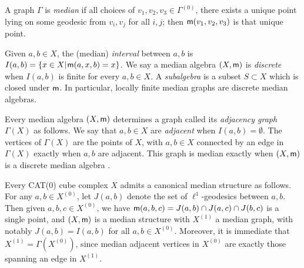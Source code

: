 \documentclass{amsart}
\theoremstyle{definition}
\theoremstyle{remark}
\theoremstyle{definition}
\newcommand{\mm}{{\sf m}}
\begin{document}
A graph $\Gamma$ is \emph{median} if all choices of $v_1,v_2,v_3 \in \Gamma^{(0)}$, there exists a unique point lying on some geodesic from $v_i,v_j$ for all $i,j$; then $\mm(v_1,v_2,v_3)$ is that unique point.

Given $a,b \in X$, the (median) \emph{interval} between $a,b$ is $I(a,b) = \{x \in X| \hspace{.01in} \mm(a,x,b) = x\}$.  We say a median algebra $(X, \mm)$ is \emph{discrete} when $I(a,b)$ is finite for every $a,b \in X$.  A \emph{subalgebra} is a subset $S \subset X$ which is closed under $\mm$.  In particular, locally finite median graphs are discrete median algebras.


Every median algebra $(X,\mm)$ determines a graph called its \emph{adjacency graph} $\Gamma(X)$ as follows.  We say that $a,b \in X$ are \emph{adjacent} when $I(a,b) = \emptyset$.  The vertices of $\Gamma(X)$ are the points of $X$, with $a,b \in X$ connected by an edge in $\Gamma(X)$ exactly when $a,b$ are adjacent.  This graph is median exactly when $(X,\mm)$ is a discrete median algebra \cite[Lemma 16.1.2]{bowditch2022median}.

Every CAT(0) cube complex $X$ admits a canonical median structure as follows.  For any $a,b \in X^{(0)}$, let $J(a,b)$ denote the set of $\ell^1$-geodesics between $a,b$.  Then given $a,b,c \in X^{(0)}$, we have $\mm(a,b,c) = J(a,b) \cap J(a,c) \cap J(b,c)$ is a single point, and $(X, \mm)$ is a median structure with $X^{(1)}$ a median graph, with notably $J(a,b) = I(a,b)$ for all $a, b \in X^{(0)}$.  Moreover, it is immediate that $X^{(1)} = \Gamma(X^{(0)})$, since median adjacent vertices in $X^{(0)}$ are exactly those spanning an edge in $X^{(1)}$.
\end{document}
